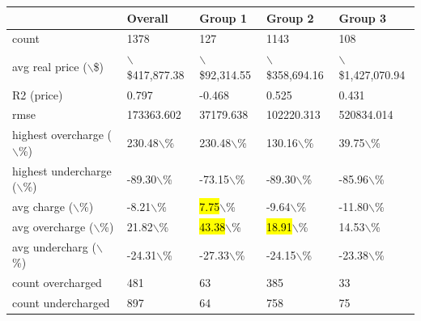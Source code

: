 \documentclass{article}
\begin{document}
\begin{table}[!ht]
    \centering
    \begin{tabular}{|l|l|l|l|l|}
    \hline
        ~ & Overall & Group 1 & Group 2 & Group 3 \\ \hline
        count & 1378 & 127 & 1143 & 108 \\ \hline
        avg real price ($\backslash$\$) & $\backslash$\$417,877.38 & $\backslash$\$92,314.55 & $\backslash$\$358,694.16 & $\backslash$\$1,427,070.94 \\ \hline
        R2 (price) & 0.797 & -0.468 & 0.525 & 0.431 \\ \hline
        rmse & 173363.602 & 37179.638 & 102220.313 & 520834.014 \\ \hline
        highest overcharge ($\backslash$\%) & 230.48$\backslash$\% & 230.48$\backslash$\% & 130.16$\backslash$\% & 39.75$\backslash$\% \\ \hline
        highest undercharge ($\backslash$\%) & -89.30$\backslash$\% & -73.15$\backslash$\% & -89.30$\backslash$\% & -85.96$\backslash$\% \\ \hline
        avg charge ($\backslash$\%) & -8.21$\backslash$\% & \hl{7.75}$\backslash$\% & -9.64$\backslash$\% & -11.80$\backslash$\% \\ \hline
        avg overcharge ($\backslash$\%) & 21.82$\backslash$\% & \hl{43.38}$\backslash$\% & \hl{18.91}$\backslash$\% & 14.53$\backslash$\% \\ \hline
        avg undercharg ($\backslash$\%) & -24.31$\backslash$\% & -27.33$\backslash$\% & -24.15$\backslash$\% & -23.38$\backslash$\% \\ \hline
        count overcharged & 481 & 63 & 385 & 33 \\ \hline
        count undercharged & 897 & 64 & 758 & 75 \\ \hline
    \end{tabular}


\end{table}
\end{document}
